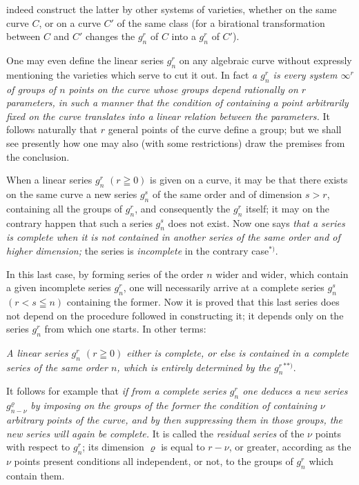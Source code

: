 \documentclass{article}
\begin{document}
indeed construct the latter by other systems of varieties, whether on the same curve $C$, or on a curve $C'$ of the same class (for a birational transformation between $C$ and $C'$ changes the $g_{n}^{r}$ of $C$ into a $g_{n}^{r}$ of $C'$).

One may even define the linear series $g_{n}^{r}$ on any algebraic curve without expressly mentioning the varieties which serve to cut it out. In fact \emph{a $g_{n}^{r}$ is every system $\infty^{r}$ of groups of $n$ points on the curve whose groups depend rationally on $r$ parameters, in such a manner that the condition of containing a point arbitrarily fixed on the curve translates into a linear relation between the parameters.} It follows naturally that $r$ general points of the curve define a group; but we shall see presently how one may also (with some restrictions) draw the premises from the conclusion.

When a linear series $g_{n}^{r}$ $(r \geqq 0)$ is given on a curve, it may be that there exists on the same curve a new series $g_{n}^{s}$ of the same order and of dimension $s > r$, containing all the groups of $g_{n}^{r}$, and consequently the $g_{n}^{r}$ itself; it may on the contrary happen that such a series $g_{n}^{s}$ does not exist. Now one says \emph{that a series is complete when it is not contained in another series of the same order and of higher dimension;} the series is \emph{incomplete} in the contrary case${}^{*)}$.

In this last case, by forming series of the order $n$ wider and wider, which contain a given incomplete series $g_{n}^{r}$, one will necessarily arrive at a complete series $g_{n}^{s}$ $(r < s \leqq n)$ containing the former. Now it is proved that this last series does not depend on the procedure followed in constructing it; it depends only on the series $g_{n}^{r}$ from which one starts. In other terms:

\emph{A linear series $g_{n}^{r}$ $(r \geqq 0)$ either is complete, or else is contained in a complete series of the same order $n$, which is entirely determined by the $g_{n}^{r}$}${}^{**)}$.

It follows for example that \emph{if from a complete series $g_{n}^{r}$ one deduces a new series $g_{n-\nu}^{\varrho}$ by imposing on the groups of the former the condition of containing $\nu$ arbitrary points of the curve, and by then suppressing them in those groups, the new series will again be complete.} It is called the \emph{residual series} of the $\nu$ points with respect to $g_{n}^{r}$; its dimension $\varrho$ is equal to $r - \nu$, or greater, according as the $\nu$ points present conditions all independent, or not, to the groups of $g_{n}^{r}$ which contain them.
\end{document}
